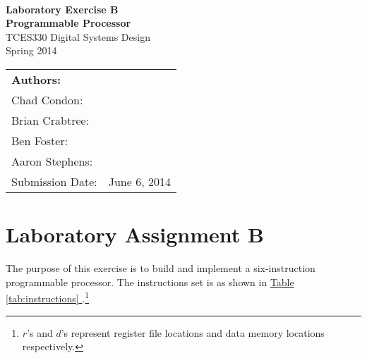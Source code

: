 \documentclass[12pt]{article}
\begin{document}
\begin{titlepage}
    \center
    \qquad\\[7cm]
    {\huge \bfseries Laboratory Exercise B} \\[.5cm]
    {\huge \bfseries Programmable Processor} \\[1.0cm]
    {\large TCES330 Digital Systems Design} \\[.5cm]
    {\large Spring 2014} \\[1.5cm]
    
    \begin{tabular}{ll}
        \multicolumn{2}{l}{\textbf{Authors:}}           \\
        Chad Condon:        & \underline{\hspace{5cm}}  \\
        Brian Crabtree:     & \underline{\hspace{5cm}}  \\
        Ben Foster:         & \underline{\hspace{5cm}}  \\
        Aaron Stephens:     & \underline{\hspace{5cm}}  \\
        Submission Date:    & June 6, 2014              \\
    \end{tabular}
    
\end{titlepage}

\tableofcontents
\pagebreak

\section*{Laboratory Assignment B}  \FloatBarrier

The purpose of this exercise is to build and implement a six-instruction programmable processor.
The instructions set is as shown in \hyperref[tab:instructions]{Table \ref*{tab:instructions} }.\footnote{%
    $r$'s and $d$'s represent register file locations and data memory locations respectively.
}
\end{document}
